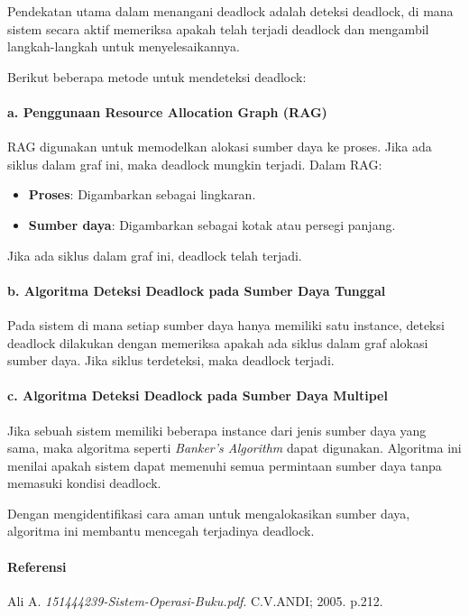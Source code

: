 \documentclass[12pt]{article}
\begin{document}
Pendekatan utama dalam menangani deadlock adalah deteksi deadlock, di mana sistem secara aktif memeriksa apakah telah terjadi deadlock dan mengambil langkah-langkah untuk menyelesaikannya.

Berikut beberapa metode untuk mendeteksi deadlock:

\paragraph{a. Penggunaan Resource Allocation Graph (RAG)}

RAG digunakan untuk memodelkan alokasi sumber daya ke proses. Jika ada siklus dalam graf ini, maka deadlock mungkin terjadi. Dalam RAG:

\begin{itemize}
    \item \textbf{Proses}: Digambarkan sebagai lingkaran.
    \item \textbf{Sumber daya}: Digambarkan sebagai kotak atau persegi panjang.
\end{itemize}

Jika ada siklus dalam graf ini, deadlock telah terjadi.

\paragraph{b. Algoritma Deteksi Deadlock pada Sumber Daya Tunggal}

Pada sistem di mana setiap sumber daya hanya memiliki satu instance, deteksi deadlock dilakukan dengan memeriksa apakah ada siklus dalam graf alokasi sumber daya. Jika siklus terdeteksi, maka deadlock terjadi.

\paragraph{c. Algoritma Deteksi Deadlock pada Sumber Daya Multipel}

Jika sebuah sistem memiliki beberapa instance dari jenis sumber daya yang sama, maka algoritma seperti \textit{Banker's Algorithm} dapat digunakan. Algoritma ini menilai apakah sistem dapat memenuhi semua permintaan sumber daya tanpa memasuki kondisi deadlock.

Dengan mengidentifikasi cara aman untuk mengalokasikan sumber daya, algoritma ini membantu mencegah terjadinya deadlock.

\paragraph{Referensi}
Ali A. \textit{151444239-Sistem-Operasi-Buku.pdf}. C.V.ANDI; 2005. p.212.
\end{document}
